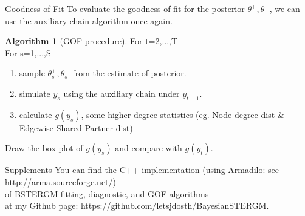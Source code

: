 \documentclass[aspectratio=169,ignorenonframetext,9pt]{beamer}
\theoremstyle{plain}
\theoremstyle{definition}
\newtheorem{algo}{Algorithm}[section]
\begin{document}
\begin{frame}{Goodness of Fit}
    To evaluate the goodness of fit for the posterior $\theta^+,\theta^-$,
    we can use the auxiliary chain algorithm once again.
    \begin{algo}[GOF procedure]
        For t=2,...,T
        \\For s=1,...,S
        \begin{enumerate}
            \item sample $\theta_s^+,\theta_s^-$ from the estimate of posterior.
            \item simulate $y_s$ using the auxiliary chain under $y_{t-1}$.
            \item calculate $g(y_s)$, some higher degree statistics (eg. Node-degree dist \& Edgewise Shared Partner dist)
        \end{enumerate}
        Draw the box-plot of $g(y_s)$ and compare with $g(y_t)$.
    \end{algo}
\end{frame}

\begin{frame}{Supplements}
    You can find the C++ implementation (using Armadilo: see http://arma.sourceforge.net/)
    \\ of BSTERGM fitting, diagnostic, and GOF algorithms
    \\ at my Github page: https://github.com/letsjdosth/BayesianSTERGM.
\end{frame}
\end{document}
